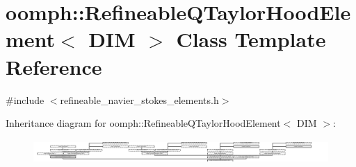 \hypertarget{classoomph_1_1RefineableQTaylorHoodElement}{}\section{oomph\+:\+:Refineable\+Q\+Taylor\+Hood\+Element$<$ D\+IM $>$ Class Template Reference}
\label{classoomph_1_1RefineableQTaylorHoodElement}


{\ttfamily \#include $<$refineable\+\_\+navier\+\_\+stokes\+\_\+elements.\+h$>$}

Inheritance diagram for oomph\+:\+:Refineable\+Q\+Taylor\+Hood\+Element$<$ D\+IM $>$\+:\begin{figure}[H]
\begin{center}
\leavevmode
\includegraphics[height=0.911805cm]{classoomph_1_1RefineableQTaylorHoodElement}
\end{center}
\end{figure}
